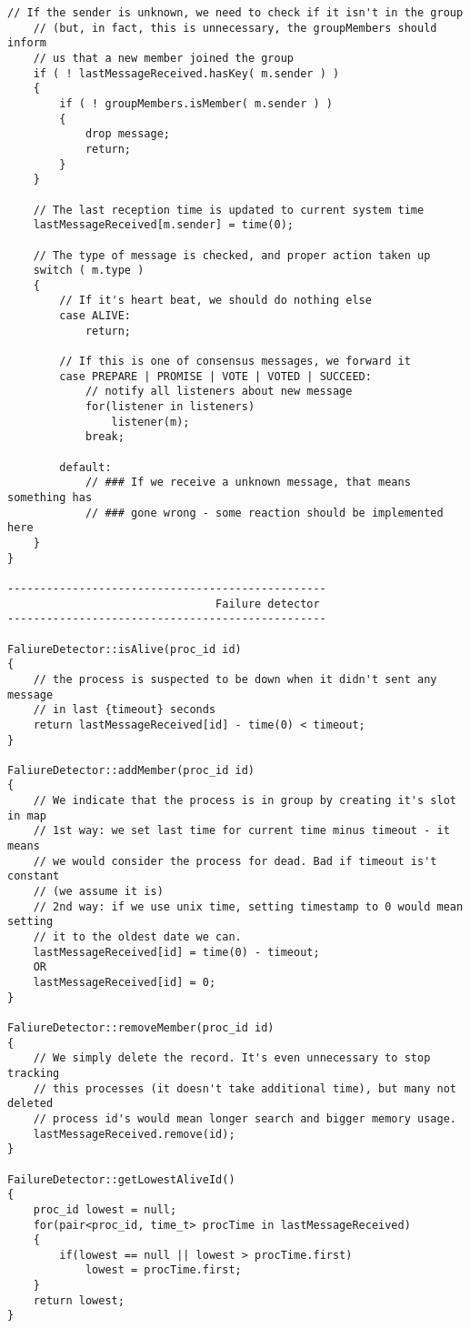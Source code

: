 \begin{lstlisting}[frame=lines,caption=Pseudocode of Paxos algorithm]
	// If the sender is unknown, we need to check if it isn't in the group
	// (but, in fact, this is unnecessary, the groupMembers should inform
	// us that a new member joined the group
	if ( ! lastMessageReceived.hasKey( m.sender ) )
	{
		if ( ! groupMembers.isMember( m.sender ) )
		{
			drop message;
			return;
		}
	}

	// The last reception time is updated to current system time
	lastMessageReceived[m.sender] = time(0);

	// The type of message is checked, and proper action taken up
	switch ( m.type )
	{
		// If it's heart beat, we should do nothing else
		case ALIVE:
			return;

		// If this is one of consensus messages, we forward it
		case PREPARE | PROMISE | VOTE | VOTED | SUCCEED:
			// notify all listeners about new message
			for(listener in listeners)
				listener(m);
			break;
			
		default:
			// ### If we receive a unknown message, that means something has
			// ### gone wrong - some reaction should be implemented here
	}
}

-------------------------------------------------
							    Failure detector
-------------------------------------------------

FaliureDetector::isAlive(proc_id id)
{
	// the process is suspected to be down when it didn't sent any message
	// in last {timeout} seconds
	return lastMessageReceived[id] - time(0) < timeout;
}

FaliureDetector::addMember(proc_id id)
{
	// We indicate that the process is in group by creating it's slot in map
	// 1st way: we set last time for current time minus timeout - it means
	// we would consider the process for dead. Bad if timeout is't constant
	// (we assume it is)
	// 2nd way: if we use unix time, setting timestamp to 0 would mean setting
	// it to the oldest date we can.
	lastMessageReceived[id] = time(0) - timeout;
	OR
	lastMessageReceived[id] = 0;
}

FaliureDetector::removeMember(proc_id id)
{
	// We simply delete the record. It's even unnecessary to stop tracking
	// this processes (it doesn't take additional time), but many not deleted
	// process id's would mean longer search and bigger memory usage.
	lastMessageReceived.remove(id);
}

FailureDetector::getLowestAliveId()
{
	proc_id lowest = null;
	for(pair<proc_id, time_t> procTime in lastMessageReceived)
	{
		if(lowest == null || lowest > procTime.first)
			lowest = procTime.first;
	}
	return lowest;
}


\end{lstlisting}

